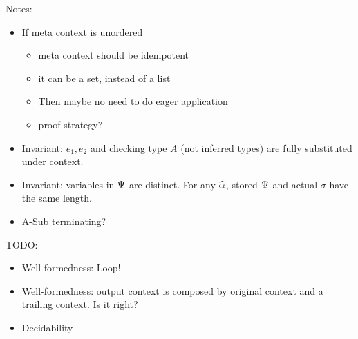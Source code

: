 Notes:
\begin{itemize}
  \item If meta context is unordered
    \begin{itemize}
    \item meta context should be idempotent
    \item it can be a set, instead of a list
    \item Then maybe no need to do eager application
    \item proof strategy?
    \end{itemize}
  \item Invariant: $e_1, e_2$ and checking type $A$ (not inferred types) are
    fully substituted under context.
  \item Invariant: variables in $\Psi$ are distinct. For any $\widehat{\alpha}$, stored
      $\Psi$ and actual $\sigma$ have the same length.
  \item A-Sub terminating?
\end{itemize}

TODO:
\begin{itemize}
  \item Well-formedness: Loop!.
  \item Well-formedness: output context is composed by original context and a
    trailing context. Is it right?
  \item Decidability
\end{itemize}


